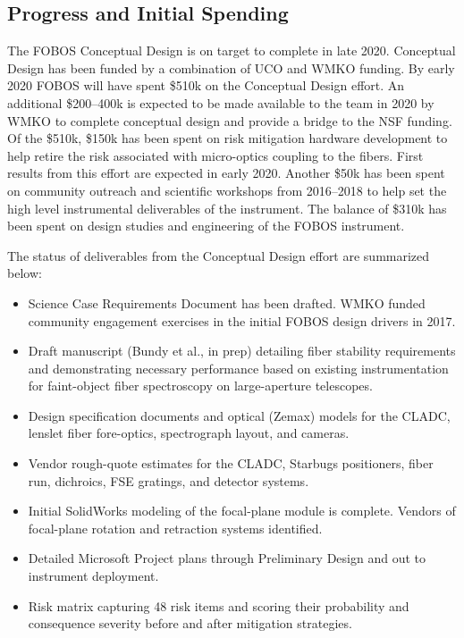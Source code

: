 \documentclass[oneside,11pt]{amsart}
\begin{document}
\subsection{Progress and Initial Spending}

The FOBOS Conceptual Design is on target to complete in late 2020.
Conceptual Design has been funded by a combination of UCO and WMKO
funding. By early 2020 FOBOS will have spent \$510k on the Conceptual
Design effort. An additional \$200--400k is expected to be made
available to the team in 2020 by WMKO to complete conceptual design
and provide a bridge to the NSF funding. Of the \$510k, \$150k has
been spent on risk mitigation hardware development to help retire the
risk associated with micro-optics coupling to the fibers. First
results from this effort are expected in early 2020. Another \$50k
has been spent on community outreach and scientific workshops from
2016--2018 to help set the high level instrumental deliverables of
the instrument. The balance of \$310k has been spent on design
studies and engineering of the FOBOS instrument.

\noindent The status of deliverables from the Conceptual Design
effort are summarized below:

\begin{itemize}
%
\item Science Case Requirements Document has been drafted. WMKO
funded community engagement exercises in the initial FOBOS design
drivers in 2017.

%
\item Draft manuscript (Bundy et al., in prep) detailing fiber
stability requirements and demonstrating necessary performance based
on existing instrumentation for faint-object fiber spectroscopy on
large-aperture telescopes.
%
\item Design specification documents and optical (Zemax) models for
the CLADC, lenslet fiber fore-optics, spectrograph layout, and
cameras.
%
\item Vendor rough-quote estimates for the CLADC, Starbugs
positioners, fiber run, dichroics, FSE gratings, and detector
systems.
%
\item Initial SolidWorks modeling of the focal-plane module is
complete. Vendors of focal-plane rotation and retraction systems
identified.
%
\item Detailed Microsoft Project plans through Preliminary Design and
out to instrument deployment.
%
\item Risk matrix capturing 48 risk items and scoring their
probability and consequence severity before and after mitigation
strategies.
%
\end{itemize}
\end{document}
